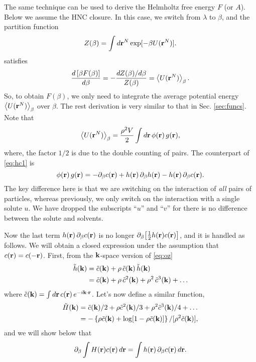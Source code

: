 \documentclass[12pt]{article}
\begin{document}
The same technique can be used to derive the Helmholtz free energy $F$ (or $A$).
%
Below we assume the HNC closure.
%
In this case, we switch from $\lambda$ to $\beta$,
and the partition function
%
\begin{equation}
  Z(\beta) = \int d\mathbf{r}^N \exp[-\beta U(\mathbf{r}^N)].
  \label{eq:partfunc_beta}
\end{equation}
%
satisfies
\begin{align*}
  \frac{ d \left[ \beta F(\beta) \right] }
  { d \beta }
  = -\frac{ d Z(\beta) / d \beta }{Z(\beta)}
  = \left\langle
      U(\mathbf{r}^N)
    \right\rangle_\beta.
\end{align*}
%
So, to obtain $F(\beta)$, we only need to integrate
  the average potential energy
  $\left\langle U(\mathbf{r}^N) \right\rangle_\beta$
  over $\beta$.
%
The rest derivation is very similar to that in Sec. \ref{sec:funcs}.
%
Note that
%
\begin{equation}
  \left\langle
    U(\mathbf{r}^N)
  \right\rangle_\beta
  =
  \frac{\rho^2 V}{2} \int d \mathbf{r} \, \phi(\mathbf{r}) \, g(\mathbf{r}),
\end{equation}
%
where, the factor $1/2$ is due to the double counting of pairs.
%
The counterpart of \eqref{eq:hc1} is
%
\begin{equation}
  \phi(\mathbf{r}) \, g(\mathbf{r})
  =
  - \partial_\beta c(\mathbf{r}) + h(\mathbf{r}) \, \partial_\beta h(\mathbf{r}) - h(\mathbf{r}) \, \partial_\beta c(\mathbf{r}).
  \label{eq:hcall}
\end{equation}
%
The key difference here is that we are switching on the interaction
  of \emph{all} pairs of particles, whereas previously, we only switch on
  the interaction with a single solute $u$.
%
We have dropped the subscripts ``$u$'' and ``$v$''
  for there is no difference between the solute and solvents.


Now the last term $h(\mathbf{r}) \, \partial_\beta c(\mathbf{r})$
  is no longer $\partial_\beta \big[ \frac{1}{2} h(\mathbf{r}) c(\mathbf{r}) \big]$,
  and it is handled as follows.
%
We will obtain a closed expression under the assumption
  that $c(\mathbf{r}) = c(-\mathbf{r})$.
%
First, from the $\mathbf{k}$-space version of \eqref{eq:oz}
\begin{align*}
  \tilde{h}(\mathbf{k})
  &= \tilde{c}(\mathbf{k}) + \rho \, \tilde{c}(\mathbf{k}) \, \tilde{h}(\mathbf{k}) \\
  &= \tilde{c}(\mathbf{k}) + \rho \, \tilde{c}^2(\mathbf{k})
               + \rho^2 \, \tilde{c}^3(\mathbf{k})
               + \dots
\end{align*}
%
where $\tilde{c}(\mathbf{k}) = \int d\mathbf{r} \, c(\mathbf{r}) \, e^{-i \mathbf{k}\cdot\mathbf{r}}$.
%
Let's now define a similar function,
%
\begin{align*}
  \tilde{H}(\mathbf{k})
  &= \tilde{c}(\mathbf{k})/2
   + \rho \tilde{c}^2(\mathbf{k})/3
   + \rho^2 \tilde{c}^3(\mathbf{k})/4
    + \dots \\
  &= -\left\{
        \rho \tilde{c}(\mathbf{k})
        + \log[1 - \rho \tilde{c}(\mathbf{k})]
    \right\} / [\rho^2 \tilde{c}(\mathbf{k})],
\end{align*}
%
and we will show below that
\begin{equation}
  \partial_\beta \int H(\mathbf{r}) c(\mathbf{r}) \, d \mathbf{r}
  = \int h(\mathbf{r}) \, \partial_\beta c(\mathbf{r}) \, d \mathbf{r}.
  \label{eq:bigH}
\end{equation}
\end{document}

